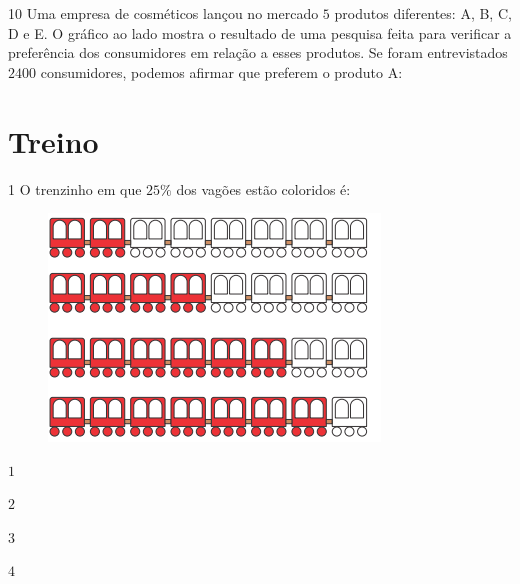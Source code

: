 \num{10} Uma empresa de cosméticos lançou no mercado $5$ produtos diferentes:
A, B, C, D e E. O gráfico ao lado mostra o resultado de uma pesquisa feita para
verificar a preferência dos consumidores em relação a esses produtos. Se foram entrevistados $2400$ consumidores, podemos afirmar que preferem o
produto A:


\section{Treino}

\num{1}  O trenzinho em que $25\%$ dos vagões estão coloridos é:

\begin{figure}[h]
\centering\includegraphics[width=3.46528in,height=2.38403in]{./imgSAEB_6_MAT/media/image89.png}
\end{figure}

\begin{escolha}
\item $1$
\item $2$
\item $3$
\item $4$
\end{escolha}


